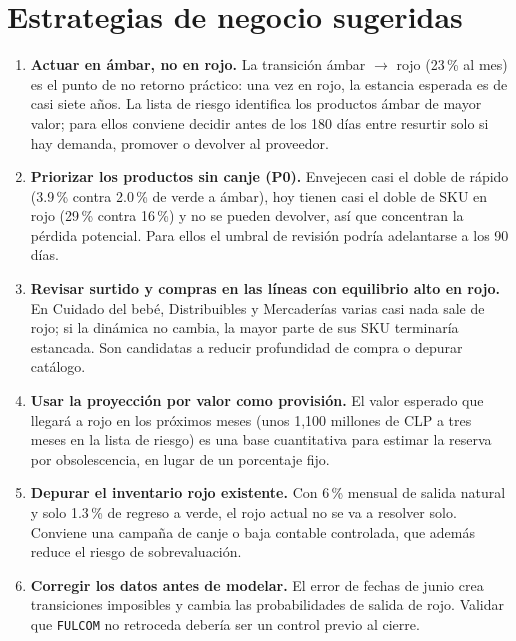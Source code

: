 \documentclass[11pt,letterpaper]{article}
\begin{document}
\section{Estrategias de negocio sugeridas}

\begin{enumerate}
  \item \textbf{Actuar en ámbar, no en rojo.} La transición ámbar $\to$ rojo (23\,\% al mes) es el punto de no retorno práctico: una vez en rojo, la estancia esperada es de casi siete años. La lista de riesgo identifica los productos ámbar de mayor valor; para ellos conviene decidir antes de los 180 días entre resurtir solo si hay demanda, promover o devolver al proveedor.
  \item \textbf{Priorizar los productos sin canje (P0).} Envejecen casi el doble de rápido (3.9\,\% contra 2.0\,\% de verde a ámbar), hoy tienen casi el doble de SKU en rojo (29\,\% contra 16\,\%) y no se pueden devolver, así que concentran la pérdida potencial. Para ellos el umbral de revisión podría adelantarse a los 90 días.
  \item \textbf{Revisar surtido y compras en las líneas con equilibrio alto en rojo.} En Cuidado del bebé, Distribuibles y Mercaderías varias casi nada sale de rojo; si la dinámica no cambia, la mayor parte de sus SKU terminaría estancada. Son candidatas a reducir profundidad de compra o depurar catálogo.
  \item \textbf{Usar la proyección por valor como provisión.} El valor esperado que llegará a rojo en los próximos meses (unos 1,100 millones de CLP a tres meses en la lista de riesgo) es una base cuantitativa para estimar la reserva por obsolescencia, en lugar de un porcentaje fijo.
  \item \textbf{Depurar el inventario rojo existente.} Con 6\,\% mensual de salida natural y solo 1.3\,\% de regreso a verde, el rojo actual no se va a resolver solo. Conviene una campaña de canje o baja contable controlada, que además reduce el riesgo de sobrevaluación.
  \item \textbf{Corregir los datos antes de modelar.} El error de fechas de junio crea transiciones imposibles y cambia las probabilidades de salida de rojo. Validar que \texttt{FULCOM} no retroceda debería ser un control previo al cierre.
\end{enumerate}

\end{document}
